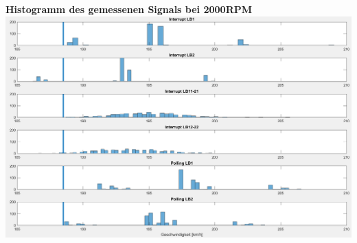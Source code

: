 \textbf{Histogramm des gemessenen Signals bei 2000RPM}\newline
\includegraphics[width=\textwidth]{images/hist2000.png}
